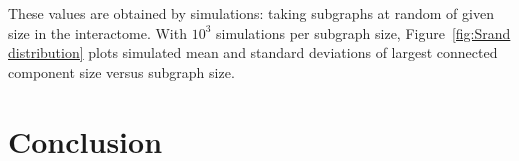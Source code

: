 \documentclass[letterpaper]{article}
\begin{document}
	These values are obtained by simulations: taking subgraphs at random of given size in the
	interactome. With $10^3$ simulations per subgraph size, Figure~\ref{fig:Srand distribution}
	plots simulated mean and standard deviations of largest connected component size versus
	subgraph size.


\section{Conclusion}

\footnotesize

{}
\end{document}
